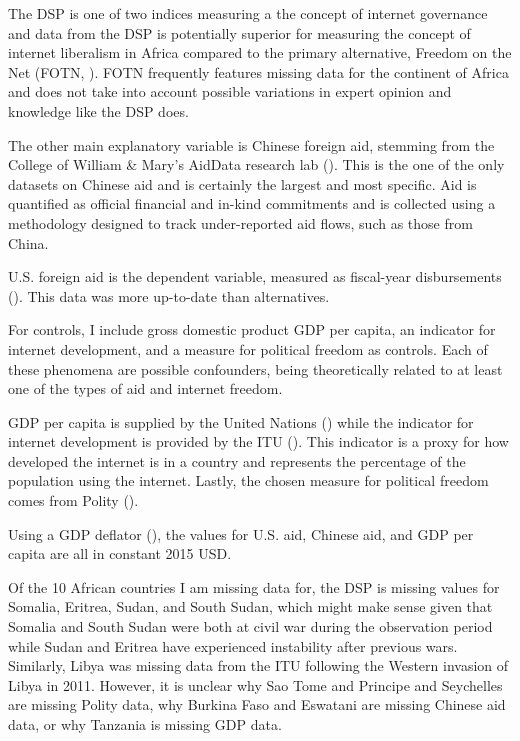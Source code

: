 \documentclass[12pt]{article}
\begin{document}
The DSP is one of two indices measuring a the concept of internet governance and data from the DSP is potentially superior for measuring the concept of internet liberalism in Africa compared to the primary alternative, Freedom on the Net (FOTN, \cite{freedomhouse2022}). FOTN frequently features missing data for the continent of Africa and does not take into account possible variations in expert opinion and knowledge like the DSP does.

The other main explanatory variable is Chinese foreign aid, stemming from the College of William \& Mary's AidData research lab (\cite{custer2021}). This is the one of the only datasets on Chinese aid and is certainly the largest and most specific. Aid is quantified as official financial and in-kind commitments and is collected using a methodology designed to track under-reported aid flows, such as those from China.

U.S. foreign aid is the dependent variable, measured as fiscal-year disbursements (\cite{u.s.agencyforinternationaldevelopment2022}). This data was more up-to-date than alternatives.

For controls, I include gross domestic product GDP per capita, an indicator for internet development, and a measure for political freedom as controls. Each of these phenomena are possible confounders, being theoretically related to at least one of the types of aid and internet freedom. 

GDP per capita is supplied by the United Nations (\cite{unitednationsstatisticsdivision2019}) while the indicator for internet development is provided by the ITU (\cite{internationaltelecommunicationunion2022}). This indicator is a proxy for how developed the internet is in a country and represents the percentage of the population using the internet. Lastly, the chosen measure for political freedom comes from Polity (\cite{marshall2018}).

Using a GDP deflator (\cite{organizationforeconomicco-operationanddevelopment2022}), the values for U.S. aid, Chinese aid, and GDP per capita are all in constant 2015 USD.

Of the 10 African countries I am missing data for, the DSP is missing values for Somalia, Eritrea, Sudan, and South Sudan, which might make sense given that Somalia and South Sudan were both at civil war during the observation period while Sudan and Eritrea have experienced instability after previous wars. Similarly, Libya was missing data from the ITU following the Western invasion of Libya in 2011. However, it is unclear why Sao Tome and Principe and Seychelles are missing Polity data, why Burkina Faso and Eswatani are missing Chinese aid data, or why Tanzania is missing GDP data.
\end{document}

